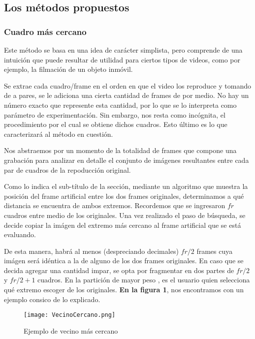 \subsection{Los m\'etodos propuestos}

\subsubsection{Cuadro m\'as cercano}

Este m\'etodo se basa en una idea de car\'acter simplista, pero comprende de una intuici\'on que puede resultar de utilidad para ciertos tipos de videos, como por ejemplo, la filmaci\'on de un objeto inm\'ovil.

Se extrae cada cuadro/frame en el orden en que el video los reproduce y tomando de a pares, se le adiciona una cierta cantidad de frames de por medio. No hay un n\'umero exacto que represente esta cantidad, por lo que se lo interpreta como par\'ametro de experimentaci\'on. Sin embargo, nos resta como inc\'ognita, el procedimiento por el cual se obtiene dichos cuadros. Esto \'ultimo es lo que caracterizar\'a al m\'etodo en cuesti\'on.

Nos abstraemos por un momento de la totalidad de frames que compone una grabaci\'on para analizar en detalle el conjunto de im\'agenes resultantes entre cada par de cuadros de la repoducci\'on original.

Como lo indica el sub-t\'itulo de la secci\'on, mediante un algoritmo que muestra la posici\'on del frame artificial entre los dos frames originales, determinamos a qu\'e distancia se encuentra de ambos extremos. Recordemos que se ingresaron $fr$ cuadros entre medio de los originales. Una vez realizado el paso de b\'usqueda, se decide copiar la im\'agen del extremo m\'as cercano al frame artificial que se est\'a evaluando. 

De esta manera, habr\'a al menos (despreciando decimales) $fr/2$  frames cuya im\'agen ser\'a id\'entica a la de alguno de los dos frames originales. En caso que se decida agregar una cantidad impar, se opta por fragmentar en dos partes de $fr/2$ y $fr/2+1$ cuadros. En la partici\'on de mayor peso
, es el usuario quien selecciona qu\'e extremo escoger de los originales. \textbf{En la figura 1}, nos encontramos con un ejemplo consico de lo explicado.

\begin{figure}[h!]
  \centering
    \texttt{[image: VecinoCercano.png]}
     \caption{Ejemplo de vecino m\'as cercano}
\end{figure}
\noindent

